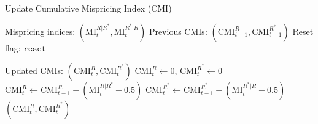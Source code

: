 \begin{algorithm}[H]
\caption{Update Cumulative Mispricing Index (CMI)}
\label{alg:cmi_update}
\begin{algorithmic}[1]
\Require
    \State Mispricing indices: $(\text{MI}_t^{R|R^*}, \text{MI}_t^{R^*|R})$
    \State Previous CMIs: $(\text{CMI}_{t-1}^R, \text{CMI}_{t-1}^{R^*})$
    \State Reset flag: $\texttt{reset}$

\mx 
\Ensure Updated CMIs: $(\text{CMI}_t^R, \text{CMI}_t^{R^*})$
\mx 
{}
        \State $\text{CMI}_t^R \gets 0$, $\text{CMI}_t^{R^*} \gets 0$
    \Comment{\scalebox{0.9}{\textcolor{Grey_color}{Reset the CMIs to 0}}} 
    \Else
        \State $\text{CMI}_t^R \gets \text{CMI}_{t-1}^R + (\text{MI}_t^{R|R^*} - 0.5)$
    \Comment{\scalebox{0.9}{\textcolor{Grey_color}{Update target CMIs with new realization of MI}}} 
        \State $\text{CMI}_t^{R^*} \gets \text{CMI}_{t-1}^{R^*} + (\text{MI}_t^{R^*|R} - 0.5)$
    \EndIf
\mx 
    \State \Return $(\text{CMI}_t^R, \text{CMI}_t^{R^*})$
\EndFunction
\end{algorithmic}
\end{algorithm}


